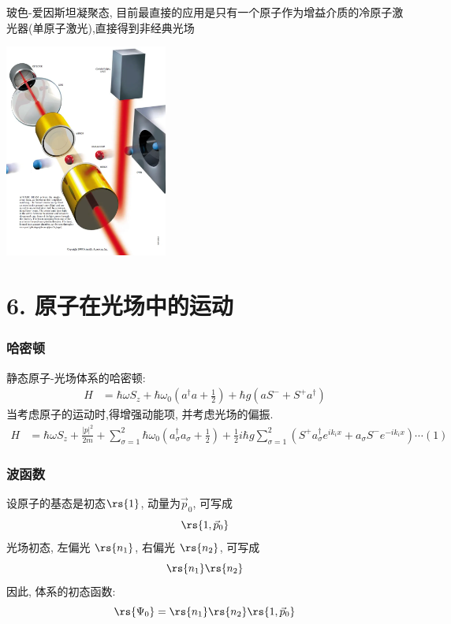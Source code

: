     \begin{frame} 
    \frametitle{}
    玻色-爱因斯坦凝聚态, 目前最直接的应用是只有一个原子作为增益介质的冷原子激光器(单原子激光),直接得到非经典光场
      \begin{center}
           \includegraphics[width=0.4\textwidth]{figs/2022-05-30-17-08-39.png}
      \end{center}
    \end{frame}

    \section{6. 原子在光场中的运动}

    \begin{frame} 
    \frametitle{哈密顿}
    静态原子-光场体系的哈密顿: 
    \[\begin{aligned}
        H &= \hbar \omega S_z + \hbar \omega_0 (a^{\dagger}  a +\frac{1}{2}) + \hbar g ( a S^- + S^+ a ^{\dagger}) 
    \end{aligned} \] 
    当考虑原子的运动时,得增强动能项, 并考虑光场的偏振.
    \[\begin{aligned}
        H &= \hbar \omega S_z + \frac{|p|^2}{2m} + \sum _{\sigma=1} ^2 \hbar \omega_0 (a^{\dagger}_\sigma  a_\sigma +\frac{1}{2}) + \frac{1}{2} i \hbar g \sum _{\sigma=1} ^2 ( S^+ a ^{\dagger} _\sigma e^{i k_i x} + a_\sigma S^- e^{-i k_i x} )  \cdots (1)
    \end{aligned} \] 
    \end{frame}

    \begin{frame} 
    \frametitle{波函数}
        设原子的基态是初态$\rs{1}$, 动量为$\vec{p}_0$, 可写成 
        \[\rs{1,\vec{p}_0}\]
        光场初态, 左偏光 $\rs{n_1}$, 右偏光 $\rs{n_2}$, 可写成
        \[ \rs{n_1} \rs{n_2}\]
        因此, 体系的初态函数:
        \[\rs{\Psi_0} = \rs{n_1} \rs{n_2}\rs{1,\vec{p}_0}\]
    \end{frame}

